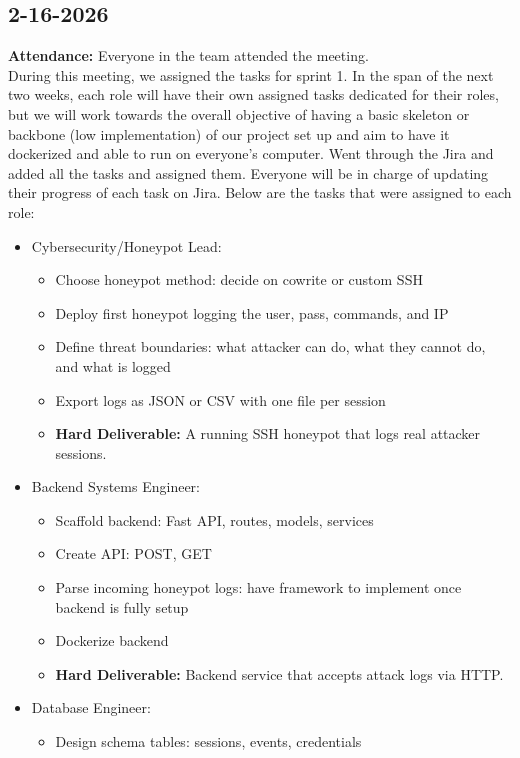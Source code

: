 \documentclass{article}
\begin{document}
\subsection{2-16-2026}
\textbf{Attendance:} Everyone in the team attended the meeting. 
\\During this meeting, we assigned the tasks for sprint 1. In the span of the next two weeks, each role will have their own assigned tasks dedicated for their roles, but we will work towards the overall objective of having a basic skeleton or backbone (low implementation) of our project set up and aim to have it dockerized and able to run on everyone's computer. Went through the Jira and added all the tasks and assigned them. Everyone will be in charge of updating their progress of each task on Jira. Below are the tasks that were assigned to each role:
\begin{itemize}
    \item Cybersecurity/Honeypot Lead:
    \begin{itemize}
        \item Choose honeypot method: decide on cowrite or custom SSH
        \item Deploy first honeypot logging the user, pass, commands, and IP
        \item Define threat boundaries: what attacker can do, what they cannot do, and what is logged
        \item Export logs as JSON or CSV with one file per session
       \item \textbf{ Hard Deliverable:} A running SSH honeypot that logs real attacker sessions.
    \end{itemize}
    \item Backend Systems Engineer:
    \begin{itemize}
        \item Scaffold backend: Fast API, routes, models, services 
        \item Create API: POST, GET
        \item Parse incoming honeypot logs: have framework to implement once backend is fully setup 
        \item Dockerize backend
        \item \textbf{Hard Deliverable:} Backend service that accepts attack logs via HTTP.
    \end{itemize}
    \item Database Engineer:
    \begin{itemize}
        \item Design schema tables: sessions, events, credentials

\end{itemize}
\end{itemize}
\end{document}
